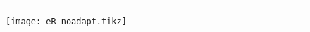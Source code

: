 \documentclass[]{article}
\begin{document}
\begin{figure}
    \centering
    \hrule
    \texttt{[image: eR\_noadapt.tikz]}
\end{figure}
\end{document}
